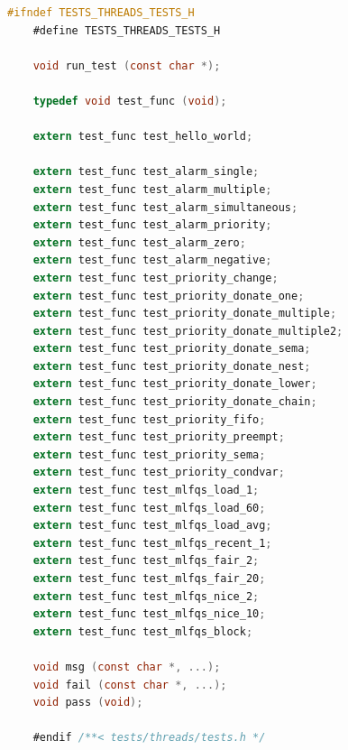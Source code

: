 \documentclass{article}
\begin{document}
\begin{lstlisting}[language=C, title=\texttt{test.h}]
	#ifndef TESTS_THREADS_TESTS_H
	#define TESTS_THREADS_TESTS_H
	
	void run_test (const char *);
	
	typedef void test_func (void);
	
	extern test_func test_hello_world;
	
	extern test_func test_alarm_single;
	extern test_func test_alarm_multiple;
	extern test_func test_alarm_simultaneous;
	extern test_func test_alarm_priority;
	extern test_func test_alarm_zero;
	extern test_func test_alarm_negative;
	extern test_func test_priority_change;
	extern test_func test_priority_donate_one;
	extern test_func test_priority_donate_multiple;
	extern test_func test_priority_donate_multiple2;
	extern test_func test_priority_donate_sema;
	extern test_func test_priority_donate_nest;
	extern test_func test_priority_donate_lower;
	extern test_func test_priority_donate_chain;
	extern test_func test_priority_fifo;
	extern test_func test_priority_preempt;
	extern test_func test_priority_sema;
	extern test_func test_priority_condvar;
	extern test_func test_mlfqs_load_1;
	extern test_func test_mlfqs_load_60;
	extern test_func test_mlfqs_load_avg;
	extern test_func test_mlfqs_recent_1;
	extern test_func test_mlfqs_fair_2;
	extern test_func test_mlfqs_fair_20;
	extern test_func test_mlfqs_nice_2;
	extern test_func test_mlfqs_nice_10;
	extern test_func test_mlfqs_block;
	
	void msg (const char *, ...);
	void fail (const char *, ...);
	void pass (void);
	
	#endif /**< tests/threads/tests.h */
\end{lstlisting}
\end{document}
